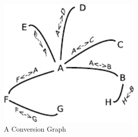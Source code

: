 \begin{figure}[htb!]
\centering
\includegraphics[width=70mm]{../img/conversionGraph.pdf}
\caption{A Conversion Graph}
\label{fig:conversionGraph}
\end{figure}

\orgcishellserviceconversion{}